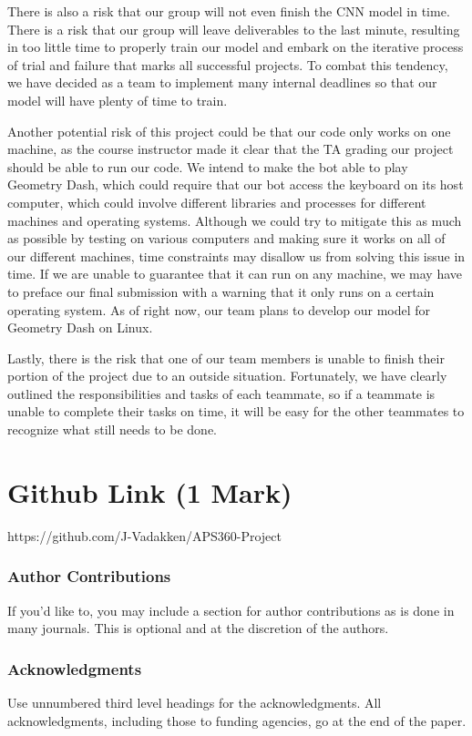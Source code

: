 \documentclass{article} %
\begin{document}
There is also a risk that our group will not even finish the CNN model 
in time. There is a risk that our group will leave deliverables to the 
last minute, resulting in too little time to properly train our model 
and embark on the iterative process of trial and failure that marks all
successful projects. To combat this tendency, we have decided as a team 
to implement many internal deadlines so that our model will have plenty 
of time to train.

Another potential risk of this project could be that our code only works
on one machine, as the course instructor made it clear that the TA grading
our project should be able to run our code. We intend to make the bot 
able to play Geometry Dash, which could require that our bot access the 
keyboard on its host computer, which could involve different libraries 
and processes for different machines and operating systems. Although 
we could try to mitigate this as much as possible by testing on various 
computers and making sure it works on all of our different machines, time
constraints may disallow us from solving this issue in time. If we are 
unable to guarantee that it can run on any machine, we may have to preface 
our final submission with a warning that it only runs on a certain 
operating system. As of right now, our team plans to develop our model 
for Geometry Dash on Linux. 

Lastly, there is the risk that one of our team members is unable to finish
their portion of the project due to an outside situation. Fortunately, 
we have clearly outlined the responsibilities and tasks of each teammate, 
so if a teammate is unable to complete their tasks on time, it will be 
easy for the other teammates to recognize what still needs to be done.


\section{Github Link (1 Mark)}
https://github.com/J-Vadakken/APS360-Project



\subsubsection*{Author Contributions}
If you'd like to, you may include  a section for author contributions as is done
in many journals. This is optional and at the discretion of the authors.

\subsubsection*{Acknowledgments}
Use unnumbered third level headings for the acknowledgments. All
acknowledgments, including those to funding agencies, go at the end of the paper.

\label{last_page}



\end{document}
